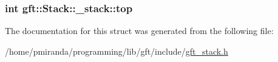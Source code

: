 \subsubsection[{\texorpdfstring{top}{top}}]{\setlength{\rightskip}{0pt plus 5cm}int gft\+::\+Stack\+::\+\_\+stack\+::top}\hypertarget{structgft_1_1Stack_1_1__stack_a6f43582a8f8320933cdbe130127c21ae}{}\label{structgft_1_1Stack_1_1__stack_a6f43582a8f8320933cdbe130127c21ae}


The documentation for this struct was generated from the following file\+:\begin{DoxyCompactItemize}
\item 
/home/pmiranda/programming/lib/gft/include/\hyperlink{gft__stack_8h}{gft\+\_\+stack.\+h}\end{DoxyCompactItemize}

